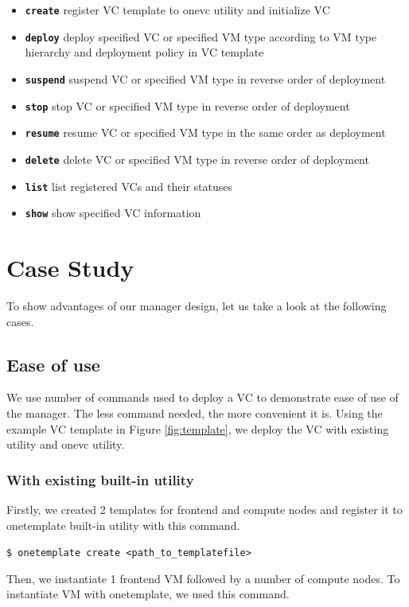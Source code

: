 \documentclass[conference]{IEEEtran}
\begin{document}
\begin{itemize}
\item \textbf{\texttt{create}} register VC template to onevc utility and initialize VC
\item \textbf{\texttt{deploy}} deploy specified VC or specified VM type according to VM type hierarchy and deployment policy in VC template 
\item \textbf{\texttt{suspend}} suspend VC or specified VM type in reverse order of deployment
\item \textbf{\texttt{stop}} stop VC or specified VM type in reverse order of deployment
\item \textbf{\texttt{resume}} resume VC or specified VM type in the same order as deployment
\item \textbf{\texttt{delete}} delete VC or specified VM type in reverse order of deployment
\item \textbf{\texttt{list}} list registered VCs and their statuses
\item \textbf{\texttt{show}} show specified VC information
\end{itemize}

\section{Case Study}
To show advantages of our manager design, let us take a look at the following cases.
 
\subsection{Ease of use}
We use number of commands used to deploy a VC to demonstrate ease of use of the manager.
The less command needed, the more convenient it is.
Using the example VC template in Figure \ref{fig:template}, we deploy the VC with existing utility and onevc utility.

\subsubsection{With existing built-in utility}
Firstly, we created 2 templates for frontend and compute nodes and register it to onetemplate built-in utility with this command.

\texttt{\$ onetemplate create <path\_to\_templatefile>}

Then, we instantiate 1 frontend VM followed by a number of compute nodes.
To instantiate VM with onetemplate, we used this command.
\end{document}
